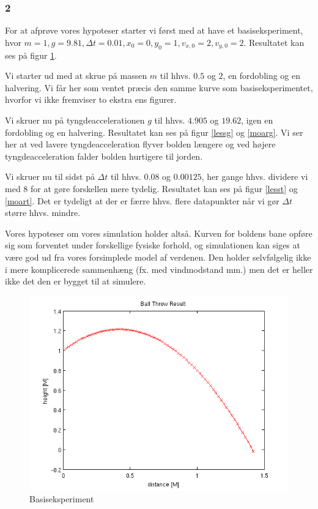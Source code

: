 \subsubsection*{2}
For at afprøve vores hypoteser starter vi først med at have et basiseksperiment,
hvor $m = 1, g = 9.81, \Delta t = 0.01, x_0 = 0, y_0 = 1, v_{x,0} = 2, v_{y,0} = 2$.
Resultatet kan ses på figur \ref{basis}.

Vi starter ud med at skrue på massen $m$ til hhvs. $0.5$ og $2$, en fordobling og en halvering.
Vi får her som ventet præcis den samme kurve som basiseksperimentet, hvorfor vi ikke fremviser
to ekstra ens figurer.

Vi skruer nu på tyngdeaccelerationen $g$ til hhvs. $4.905$ og $19.62$, igen en fordobling og en halvering.
Resultatet kan ses på figur \ref{lessg} og \ref{moarg}.
Vi ser her at ved lavere tyngdeacceleration flyver bolden længere og ved højere tyngdeacceleration falder
bolden hurtigere til jorden.

Vi skruer nu til sidst på $\Delta t$ til hhvs. $0.08$ og $0.00125$, her gange hhvs. dividere vi med 8 for
at gøre forskellen mere tydelig.
Resultatet kan ses på figur \ref{lesst} og \ref{moart}.
Det er tydeligt at der er færre hhvs. flere datapunkter når vi gør $\Delta t$ større hhvs. mindre.

Vores hypoteser om vores simulation holder altså. Kurven for boldens bane opføre sig som forventet
under forskellige fysiske forhold, og simulationen kan siges at være god ud fra vores forsimplede
model af verdenen. Den holder selvfølgelig ikke i mere komplicerede sammenhæng (fx. med vindmodstand mm.)
men det er heller ikke det den er bygget til at simulere.

\begin{figure}
\centering
\includegraphics[scale=0.75]{basisrun}
\caption{Basiseksperiment\label{basis}}
\end{figure}

